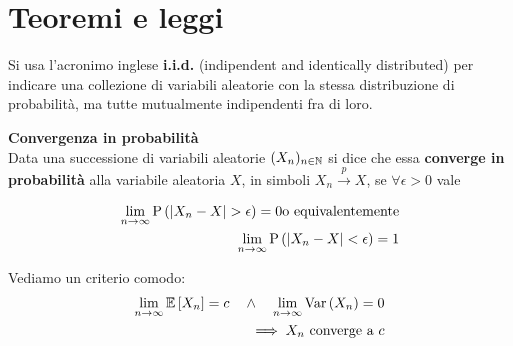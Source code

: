 \section{Teoremi e leggi}

\begin{note}
    Si usa l'acronimo inglese \textbf{i.i.d.} (indipendent and identically
    distributed) per indicare una collezione di variabili aleatorie con la
    stessa distribuzione di probabilità, ma tutte mutualmente indipendenti fra
    di loro.
\end{note}

\begin{defn}
    \textbf{Convergenza in probabilità} \\
    Data una successione di variabili aleatorie $(X_n)_{n \in \mathbb{N}}$ si dice che
    essa \textbf{converge in probabilità} alla variabile aleatoria $X$, in
    simboli $X_n \xrightarrow{p} X$, se $\forall \epsilon > 0$ vale

    \begin{equation*}
        \begin{aligned}
            \lim_{n \to \infty} \text{P}\left(\lvert X_n - X\rvert > \epsilon\right) = 0
            \text{o equivalentemente} \\
            \lim_{n \to \infty} \text{P}\left(\lvert X_n - X\rvert < \epsilon\right) = 1 \\
        \end{aligned}
    \end{equation*}

    Vediamo un criterio comodo:
    \begin{equation*}
        \begin{aligned}
            \lim_{n \to \infty} \mathbb{E}\left[X_n\right] = c \quad \land \quad \lim_{n \to \infty} \text{Var}\left(X_n\right) = 0 \\
            \implies X_n \text{ converge a } c
        \end{aligned}
    \end{equation*}


\end{defn}

